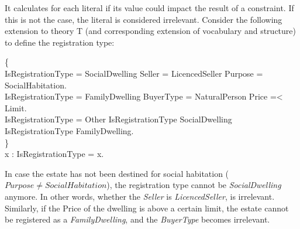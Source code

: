It calculates for each literal if its value could impact the result of a constraint.
If this is not the case, the literal is considered irrelevant.
Consider the following extension to theory T (and corresponding extension of vocabulary and structure) to define the registration type:
\begin{left}


\{~\\
IsRegistrationType = SocialDwelling \leftarrow Seller = LicencedSeller \wedge Purpose = SocialHabitation.
~\\
IsRegistrationType = FamilyDwelling \leftarrow BuyerType = NaturalPerson \wedge Price =< Limit.
~\\
IsRegistrationType = Other \leftarrow IsRegistrationType \neq SocialDwelling \wedge IsRegistrationType \neq FamilyDwelling.~\\
\}~\\
\exists x : IsRegistrationType = x.
\end{left}

In case the estate has not been destined for social habitation ($Purpose \neq SocialHabitation$), the registration type cannot be \textit{SocialDwelling} anymore.
In other words, whether the \textit{Seller} is \textit{LicencedSeller}, is irrelevant.
Similarly, if the Price of the dwelling is above a certain limit, the estate cannot be registered as a \textit{FamilyDwelling}, and the \textit{BuyerType} becomes irrelevant.

